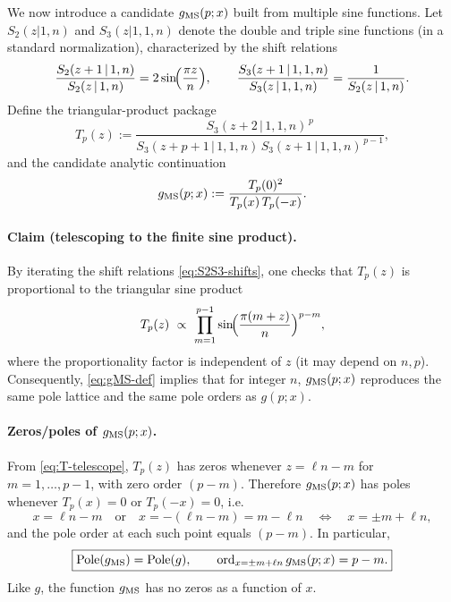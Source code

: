 \documentclass[11pt]{article}
\begin{document}
  We now introduce a candidate $g_{\rm MS}(p;x)$ built from multiple sine
  functions. Let $S_{2}(z|1,n)$ and $S_{3}(z|1,1,n)$ denote the double and triple
  sine functions (in a standard normalization), characterized by the shift
  relations
  \begin{equation}
    \frac{S_{2}(z+1\,|\,1,n)}{S_{2}(z\,|\,1,n)}=2\sin\!\Bigl(\frac{\pi z}{n}\Bigr
    ), \qquad \frac{S_{3}(z+1\,|\,1,1,n)}{S_{3}(z\,|\,1,1,n)}=\frac{1}{S_{2}(z\,|\,1,n)}
    . \label{eq:S2S3-shifts}
  \end{equation}
  Define the triangular-product package
  \begin{equation}
    T_{p}(z):= \frac{S_{3}(z+2\,|\,1,1,n)^{\,p}}{S_{3}(z+p+1\,|\,1,1,n)\,S_{3}(z+1\,|\,1,1,n)^{\,p-1}}
    , \label{eq:T-def}
  \end{equation}
  and the candidate analytic continuation
  \begin{equation}
    g_{\rm MS}(p;x):=\frac{T_{p}(0)^{2}}{T_{p}(x)\,T_{p}(-x)}. \label{eq:gMS-def}
  \end{equation}

  \paragraph{Claim (telescoping to the finite sine product).}
  By iterating the shift relations \eqref{eq:S2S3-shifts}, one checks that
  $T_{p}(z)$ is proportional to the triangular sine product
  \begin{equation}
    T_{p}(z)\ \propto\ \prod_{m=1}^{p-1}\sin\!\Bigl(\frac{\pi(m+z)}{n}\Bigr)^{p-m}
    , \label{eq:T-telescope}
  \end{equation}
  where the proportionality factor is independent of $z$ (it may depend on $n,p$).
  Consequently, \eqref{eq:gMS-def} implies that for integer $n$,
  $g_{\rm MS}(p;x)$ reproduces the same pole lattice and the same pole orders as
  $g(p;x)$.

  \paragraph{Zeros/poles of $g_{\rm MS}(p;x)$.}
  From \eqref{eq:T-telescope}, $T_{p}(z)$ has zeros whenever $z=\ell n-m$ for $m=
  1,\dots,p-1$, with zero order $(p-m)$. Therefore $g_{\rm MS}(p;x)$ has poles whenever
  $T_{p}(x)=0$ or $T_{p}(-x)=0$, i.e.
  \begin{equation}
    x=\ell n-m\quad \text{or}\quad x=-(\ell n-m)=m-\ell n \quad\Longleftrightarrow
    \quad x=\pm m+\ell n,
  \end{equation}
  and the pole order at each such point equals $(p-m)$. In particular,
  \begin{equation}
    \boxed{ \mathrm{Pole}(g_{\rm MS})=\mathrm{Pole}(g),\qquad \mathrm{ord}_{x=\pm m+\ell n}\,g_{\rm MS}(p;x)=p-m. }
  \end{equation}
  Like $g$, the function $g_{\rm MS}$ has no zeros as a function of $x$.
\end{document}
